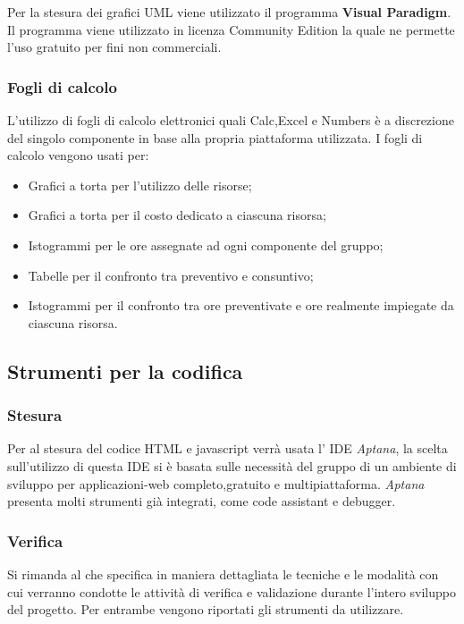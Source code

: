 Per la stesura dei grafici UML viene utilizzato il programma \textbf{Visual Paradigm}. Il programma viene utilizzato in licenza Community Edition la quale ne permette l’uso gratuito per fini non commerciali.

\subsubsection{Fogli di calcolo}
L'utilizzo di fogli di calcolo elettronici quali Calc,Excel e Numbers è a discrezione del singolo componente in base alla propria piattaforma utilizzata.
I fogli di calcolo vengono usati per:
\begin{itemize}
\item Grafici a torta per l'utilizzo delle risorse;
\item Grafici a torta per il costo dedicato a ciascuna risorsa;
\item Istogrammi per le ore assegnate ad ogni componente del gruppo;
\item Tabelle per il confronto tra preventivo e consuntivo;
\item Istogrammi per il confronto tra ore preventivate e ore realmente impiegate da
ciascuna risorsa.
\end{itemize}

\subsection{Strumenti per la codifica}
\subsubsection{Stesura}
Per al stesura del codice HTML e javascript verrà usata l' IDE \emph{Aptana}, la scelta sull'utilizzo di questa IDE si è basata sulle necessità del gruppo di un ambiente di sviluppo per applicazioni-web completo,gratuito e multipiattaforma.
\emph{Aptana} presenta molti strumenti già integrati, come code assistant e debugger. 
\subsubsection{Verifica}
Si rimanda al \href{run:../../Esterni/\fPianoDiQualifica}{\fEscapePianoDiQualifica} che specifica in maniera dettagliata
le tecniche e le modalità con cui verranno condotte le attività di verifica e validazione durante l’intero sviluppo del progetto.
Per entrambe vengono riportati gli strumenti da utilizzare. 




